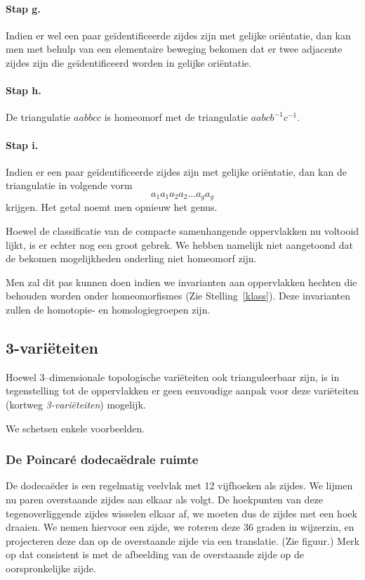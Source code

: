 \documentclass[12pt]{book}
\begin{document}
\paragraph{Stap g.}
Indien er wel een paar ge\"identificeerde zijdes zijn met gelijke ori\"entatie, dan kan men met behulp van een elementaire beweging bekomen dat er twee adjacente zijdes zijn die ge\"identificeerd worden in gelijke ori\"entatie. 
\paragraph{Stap h.}
De triangulatie $aabbcc$ is homeomorf met de triangulatie $aabcb^{-1}c^{-1}$.
\paragraph{Stap i.}
Indien er een paar ge\"identificeerde zijdes zijn met gelijke ori\"entatie, dan kan de triangulatie in volgende vorm
$$
a_1a_1a_2a_2 \dots a_ga_g
$$
krijgen. Het getal noemt men opnieuw het genus.


Hoewel de classificatie van de compacte samenhangende oppervlakken nu voltooid lijkt, is er echter nog een groot gebrek. We hebben namelijk niet aangetoond dat de bekomen mogelijkheden onderling niet homeomorf zijn. 

Men zal dit pas kunnen doen indien we invarianten aan oppervlakken hechten die behouden worden onder homeomorfismes (Zie Stelling~\ref{klass}). Deze invarianten zullen de homotopie- en homologiegroepen zijn.


\subsection{3-vari\"eteiten}
Hoewel 3--dimensionale topologische vari\"eteiten ook trianguleerbaar zijn, is in tegenstelling tot de oppervlakken er geen eenvoudige aanpak voor deze vari\"eteiten (kortweg \emph{3-vari\"eteiten}) mogelijk.

We schetsen enkele voorbeelden.

\subsubsection{De Poincar\'e dodeca\"edrale ruimte}

De dodeca\"eder is een regelmatig veelvlak met 12 vijfhoeken als zijdes. We lijmen nu paren overstaande zijdes aan elkaar als volgt. De hoekpunten van deze tegenoverliggende zijdes wisselen elkaar af, we moeten dus de zijdes met een hoek draaien. We nemen hiervoor een zijde, we roteren deze 36 graden in wijzerzin, en projecteren deze dan op de overstaande zijde via een translatie. (Zie figuur.) Merk op dat consistent is met de afbeelding van de overstaande zijde op de oorspronkelijke zijde.
\end{document}

